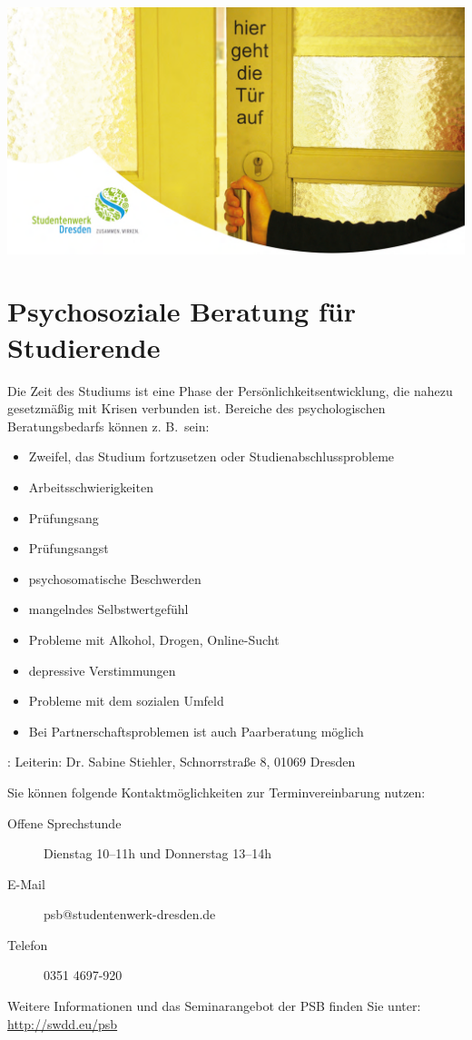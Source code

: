 \includegraphics[width=\textwidth]{./psychoberatung-titlepicture.png}

\section*{Psychosoziale Beratung für Studierende}
\label{sec:psychosoziale_beratung_fur_studierende}
Die Zeit des Studiums ist eine Phase der Persönlichkeitsentwicklung, die nahezu 
gesetzmäßig mit Krisen verbunden ist. Bereiche des psychologischen Beratungsbedarfs können z. B.\ sein:
\begin{itemize}
  \item  Zweifel, das Studium fortzusetzen oder Studienabschlussprobleme
  \item Arbeitsschwierigkeiten 
\item Prüfungsang
   \item      Prüfungsangst
  \item    psychosomatische Beschwerden
\item  mangelndes Selbstwertgefühl
\item Probleme mit Alkohol, Drogen, Online-Sucht
\item    depressive Verstimmungen
\item   Probleme mit dem sozialen Umfeld
\item   Bei Partnerschaftsproblemen ist auch Paarberatung möglich
\end{itemize}
:
\label{sub:psychosoziale_beratungsstelle_psb_}
Leiterin: Dr. Sabine Stiehler, 
Schnorrstraße 8, 01069 Dresden

Sie können folgende Kontaktmöglichkeiten zur Terminvereinbarung nutzen:
\begin{description}
  \item[Offene Sprechstunde] Dienstag 10--11h und Donnerstag 13--14h
  \item [E-Mail] psb@studentenwerk-dresden.de
  \item [Telefon] 0351 4697-920    
\end{description}
Weitere Informationen und das Seminarangebot der PSB finden Sie unter: \url{http://swdd.eu/psb}

